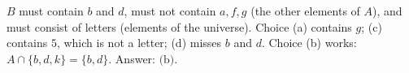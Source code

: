 $B$ must contain $b$ and $d$, must not contain $a,f,g$ (the other elements of $A$), and must consist of letters (elements of the universe). Choice (a) contains $g$; (c) contains $5$, which is not a letter; (d) misses $b$ and $d$. Choice (b) works: $A\cap\{b,d,k\}=\{b,d\}$. Answer: $\boxed{\text{(b)}}$.
